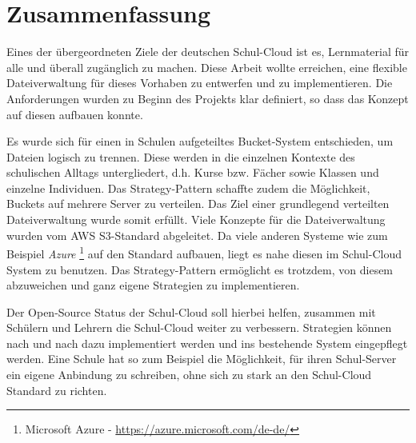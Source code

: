 \section{Zusammenfassung}
\label{sec:conclusion}

Eines der übergeordneten Ziele der deutschen Schul-Cloud ist es, Lernmaterial für alle und überall zugänglich zu machen. Diese Arbeit wollte erreichen, eine flexible Dateiverwaltung für dieses Vorhaben zu entwerfen und zu implementieren. Die Anforderungen wurden zu Beginn des Projekts klar definiert, so dass das Konzept auf diesen aufbauen konnte.

 Es wurde sich für einen in Schulen aufgeteiltes Bucket-System entschieden, um Dateien logisch zu trennen. Diese werden in die einzelnen Kontexte des schulischen Alltags untergliedert, d.h. Kurse bzw. Fächer sowie Klassen und einzelne Individuen. Das Strategy-Pattern schaffte zudem die Möglichkeit, Buckets auf mehrere Server zu verteilen. Das Ziel einer grundlegend verteilten Dateiverwaltung wurde somit erfüllt. Viele Konzepte für die Dateiverwaltung wurden vom AWS S3-Standard abgeleitet. Da viele anderen Systeme wie zum Beispiel \textit{Azure} \footnote{Microsoft Azure - \url{https://azure.microsoft.com/de-de/}} auf den Standard aufbauen, liegt es nahe diesen im Schul-Cloud System zu benutzen. Das Strategy-Pattern ermöglicht es trotzdem, von diesem abzuweichen und ganz eigene Strategien zu implementieren.

Der Open-Source Status der Schul-Cloud soll hierbei helfen, zusammen mit Schülern und Lehrern die Schul-Cloud weiter zu verbessern. Strategien können nach und nach dazu implementiert werden und ins bestehende System eingepflegt werden. Eine Schule hat so zum Beispiel die Möglichkeit, für ihren Schul-Server ein eigene Anbindung zu schreiben, ohne sich zu stark an den Schul-Cloud Standard zu richten.

\clearpage
